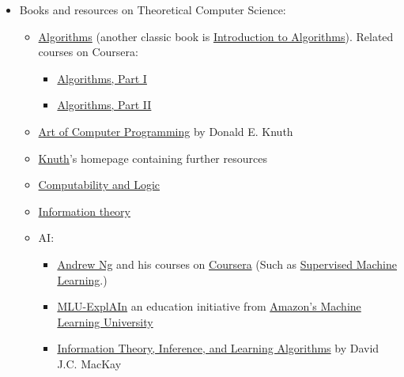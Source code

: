 \documentclass{article}
\begin{document}
\begin{itemize}
    \item Books and resources on Theoretical Computer Science:
    \begin{itemize}
    
        \item \href{https://www.goodreads.com/book/show/10803540-algorithms}{Algorithms} (another classic book is \href{https://www.goodreads.com/book/show/108986.Introduction_to_Algorithms}{Introduction to Algorithms}). Related courses on Coursera:
        \begin{itemize}
            \item \href{https://www.coursera.org/learn/algorithms-part1}{Algorithms, Part I}
            \item \href{https://www.coursera.org/learn/algorithms-part2}{Algorithms, Part II}
        \end{itemize}

        \item \href{https://cs.stanford.edu/~knuth/taocp.html}{Art of Computer Programming} by Donald E. Knuth

        \item \href{https://cs.stanford.edu/~knuth/}{Knuth}'s homepage containing further resources
        
        \item \href{https://www.goodreads.com/book/show/1556746.Computability_and_Logic}{Computability and Logic}
        
        \item \href{https://www.goodreads.com/book/show/433439.Elements_of_Information_Theory}{Information theory}
    
    \item AI:
    \begin{itemize}
        \item \href{https://www.andrewng.org/}{Andrew Ng} and his courses on \href{https://www.coursera.org/instructor/andrewng}{Coursera} (Such as \href{https://www.coursera.org/learn/machine-learning}{Supervised Machine Learning}.)
        \item \href{https://mlu-explain.github.io/}{MLU-ExplAIn} an education initiative from \href{https://aws.amazon.com/machine-learning/mlu/}{Amazon's Machine Learning University}
        \item \href{https://www.goodreads.com/book/show/201357.Information_Theory_Inference_and_Learning_Algorithms}{Information Theory, Inference, and Learning Algorithms} by David J.C. MacKay
        

\end{itemize}
\end{itemize}
\end{itemize}
\end{document}
